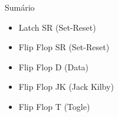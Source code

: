 
\begin{frame}{Sumário}
    \begin{itemize}
        \item Latch SR (Set-Reset)
        \item Flip Flop SR (Set-Reset)
        \item Flip Flop D (Data)
        \item Flip Flop JK (Jack Kilby)
        \item Flip Flop T (Togle)
    \end{itemize}
\end{frame}